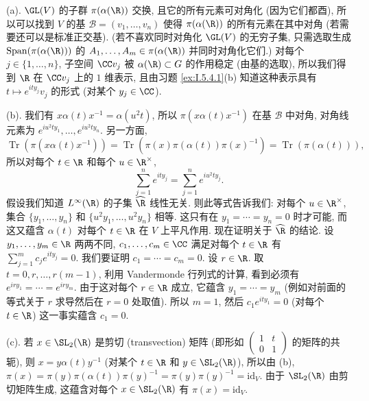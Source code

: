 \begin{solution}
(a). $\GL(V)$ 的子群 $\pi(\alpha(\R))$ 交换, 且它的所有元素可对角化 (因为它们都酉), 所以可以找到 $V$ 的基 $\mathcal{B} = (v_1, \ldots, v_n)$ 使得 $\pi(\alpha(\R))$ 的所有元素在其中对角 (若需要还可以是标准正交基). (若不喜欢同时对角化 $\GL(V)$ 的无穷子集, 只需选取生成 $\operatorname{Span}(\pi(\alpha(\R)))$ 的 $A_1, \ldots, A_m \in \pi(\alpha(\R))$ 并同时对角化它们.)
对每个 $j \in \{1, \ldots, n\}$, 子空间 $\CC v_j$ 被 $\alpha(\R) \subset G$ 的作用稳定 (由基的选取), 所以我们得到 $\R$ 在 $\CC v_j$ 上的 $1$ 维表示, 且由习题 \ref{ex:I.5.4.1}(b) 知道这种表示具有 $t \longmapsto e^{ity_j}v_j$ 的形式 (对某个 $y_j \in \CC$).

(b). 我们有 $x\alpha(t)x^{-1} = \alpha(u^2t)$, 所以 $\pi(x\alpha(t)x^{-1})$ 在基 $\mathcal{B}$ 中对角, 对角线元素为 $e^{iu^2ty_1}, \ldots, e^{iu^2ty_n}$. 另一方面,
\[
\operatorname{Tr}(\pi(x\alpha(t)x^{-1})) = \operatorname{Tr}(\pi(x)\pi(\alpha(t))\pi(x)^{-1}) = \operatorname{Tr}(\pi(\alpha(t))),
\]
所以对每个 $t \in \R$ 和每个 $u \in \R^{\times}$,
\[
\sum_{j=1}^n e^{ity_j} = \sum_{j=1}^n e^{iu^2ty_j}.
\]
假设我们知道 $L^{\infty}(\R)$ 的子集 $\widehat{\R}$ 线性无关. 则此等式告诉我们: 对每个 $u \in \R^{\times}$, 集合 $\{y_1, \ldots, y_n\}$ 和 $\{u^2y_1, \ldots, u^2y_n\}$ 相等. 这只有在 $y_1 = \cdots = y_n = 0$ 时才可能, 而这又蕴含 $\alpha(t)$ 对每个 $t \in \R$ 在 $V$ 上平凡作用.
现在证明关于 $\widehat{\R}$ 的结论. 设 $y_1, \ldots, y_m \in \R$ 两两不同, $c_1, \ldots, c_m \in \CC$ 满足对每个 $t \in \R$ 有 $\sum_{j=1}^m c_je^{ity_j} = 0$. 我们要证明 $c_1 = \cdots = c_m = 0$. 设 $r \in \R$. 取 $t = 0, r, \ldots, r(m-1)$, 利用 Vandermonde 行列式的计算, 看到必须有 $e^{iry_1} = \cdots = e^{iry_m}$. 由于这对每个 $r \in \R$ 成立, 它蕴含 $y_1 = \cdots = y_m$ (例如对前面的等式关于 $r$ 求导然后在 $r = 0$ 处取值). 所以 $m = 1$, 然后 $c_1e^{ity_1} = 0$ (对每个 $t \in \R$) 这一事实蕴含 $c_1 = 0$.

(c). 若 $x \in \SL_2(\R)$ 是剪切 (transvection) 矩阵 (即形如 $\begin{pmatrix} 1 & t \\ 0 & 1 \end{pmatrix}$ 的矩阵的共轭), 则 $x = y\alpha(t)y^{-1}$ (对某个 $t \in \R$ 和 $y \in \SL_2(\R)$), 所以由 (b), $\pi(x) = \pi(y)\pi(\alpha(t))\pi(y)^{-1} = \pi(y)\pi(y)^{-1} = \mathrm{id}_V$. 由于 $\SL_2(\R)$ 由剪切矩阵生成, 这蕴含对每个 $x \in \SL_2(\R)$ 有 $\pi(x) = \mathrm{id}_V$.


\end{solution}
